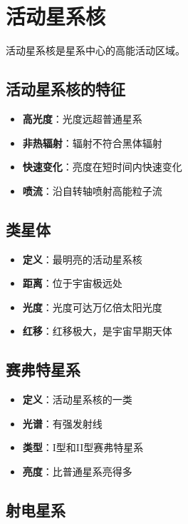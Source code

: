 \documentclass[12pt,UTF8]{ctexbook}
\begin{document}
\section{活动星系核}

活动星系核是星系中心的高能活动区域。

\subsection{活动星系核的特征}

\begin{itemize}
  \item \textbf{高光度}：光度远超普通星系
  \item \textbf{非热辐射}：辐射不符合黑体辐射
  \item \textbf{快速变化}：亮度在短时间内快速变化
  \item \textbf{喷流}：沿自转轴喷射高能粒子流
\end{itemize}

\subsection{类星体}

\begin{itemize}
  \item \textbf{定义}：最明亮的活动星系核
  \item \textbf{距离}：位于宇宙极远处
  \item \textbf{光度}：光度可达万亿倍太阳光度
  \item \textbf{红移}：红移极大，是宇宙早期天体
\end{itemize}

\subsection{赛弗特星系}

\begin{itemize}
  \item \textbf{定义}：活动星系核的一类
  \item \textbf{光谱}：有强发射线
  \item \textbf{类型}：I型和II型赛弗特星系
  \item \textbf{亮度}：比普通星系亮得多
\end{itemize}

\subsection{射电星系}
\end{document}
